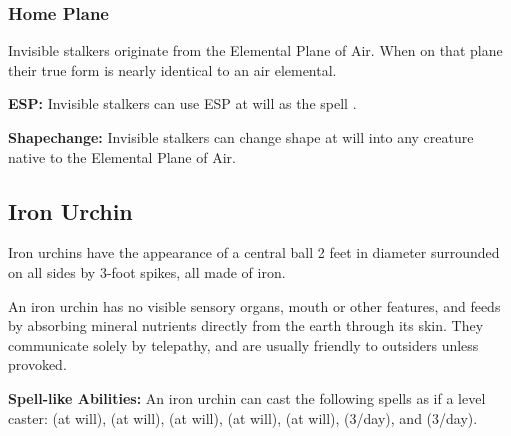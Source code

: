 \begin{multicols*}{2}
\subsubsection{Home Plane}
Invisible stalkers originate from the Elemental Plane of Air. When on that plane their true form is nearly identical to an air elemental.

\textbf{ESP:} Invisible stalkers can use ESP at will as the spell .

\textbf{Shapechange:} Invisible stalkers can change shape at will into any creature native to the Elemental Plane of Air.

\subsection{Iron Urchin}

Iron urchins have the appearance of a central ball 2 feet in diameter surrounded on all sides by 3-foot spikes, all made of iron.

An iron urchin has no visible sensory organs, mouth or other features, and feeds by absorbing mineral nutrients directly from the earth through its skin. They communicate solely by telepathy, and are usually friendly to outsiders unless provoked.

\textbf{Spell-like Abilities:} An iron urchin can cast the following spells as if a  level caster:  (at will),  (at will),  (at will),  (at will),  (at will),  (3/day), and  (3/day).


\end{multicols*}
